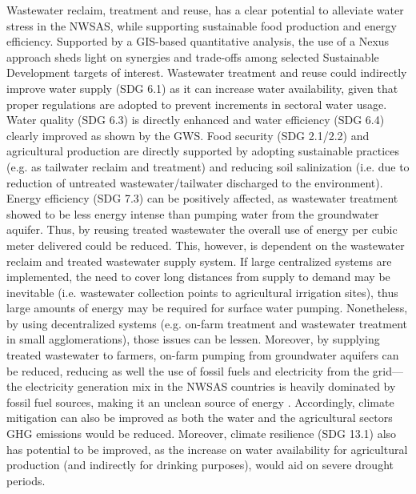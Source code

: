 Wastewater reclaim, treatment and reuse, has a clear potential to alleviate water stress in the NWSAS, while supporting sustainable food production and energy efficiency. Supported by a GIS-based quantitative analysis, the use of a Nexus approach sheds light on synergies and trade-offs among selected Sustainable Development targets of interest. Wastewater treatment and reuse could indirectly improve water supply (SDG 6.1) as it can increase water availability, given that proper regulations are adopted to prevent increments in sectoral water usage. Water quality (SDG 6.3) is directly enhanced and water efficiency (SDG 6.4) clearly improved as shown by the GWS. Food security (SDG 2.1/2.2) and agricultural production are directly supported by adopting sustainable practices (e.g. as tailwater reclaim and treatment) and reducing soil salinization (i.e. due to reduction of untreated wastewater/tailwater discharged to the environment). Energy efficiency (SDG 7.3) can be positively affected, as wastewater treatment showed to be less energy intense than pumping water from the groundwater aquifer. Thus, by reusing treated wastewater the overall use of energy per cubic meter delivered could be reduced. This, however, is dependent on the wastewater reclaim and treated wastewater supply system. If large centralized systems are implemented, the need to cover long distances from supply to demand may be inevitable (i.e. wastewater collection points to agricultural irrigation sites), thus large amounts of energy may be required for surface water pumping. Nonetheless, by using decentralized systems (e.g. on-farm treatment and wastewater treatment in small agglomerations), those issues can be lessen. 
Moreover, by supplying treated wastewater to farmers, on-farm pumping from groundwater aquifers can be reduced, reducing as well the use of fossil fuels and electricity from the grid---the electricity generation mix in the NWSAS countries is heavily dominated by fossil fuel sources, making it an unclean source of energy \cite{AlgeriaElectricityHeat2016,LibyaElectricityHeat2016,TunisiaElectricityHeat2016}. Accordingly, climate mitigation can also be improved as both the water and the agricultural sectors GHG emissions would be reduced. Moreover, climate resilience (SDG 13.1) also has potential to be improved, as the increase on water availability for agricultural production (and indirectly for drinking purposes), would aid on severe drought periods. 

